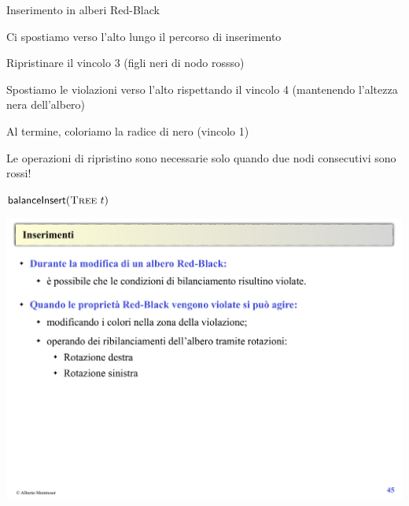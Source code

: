 \begin{frame}{Inserimento in alberi Red-Black}

\vspace{-9pt}
\begin{myboxtitle}
\BIL
\item Ci spostiamo verso l’alto lungo il percorso di inserimento 
\item Ripristinare il vincolo 3 (figli neri di nodo rossso)
\item Spostiamo le violazioni verso l’alto rispettando il vincolo 4 (mantenendo l’altezza nera dell’albero)
\item Al termine, coloriamo la radice di nero (vincolo 1)
\EIL
\end{myboxtitle}

\begin{myboxtitle}[Nota]
Le operazioni di ripristino sono necessarie solo quando due nodi consecutivi sono rossi!
\end{myboxtitle}

\end{frame}

\begin{frame}{$\textsf{balanceInsert}(\Tree\ t)$}

\includegraphics[width=1.0\textwidth,page=9]{redblack2.pdf}

\end{frame}


